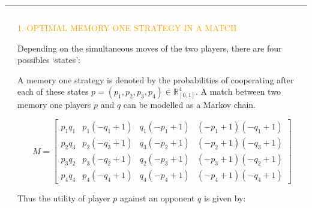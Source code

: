 \documentclass[usenames,dvipsnames,t]{beamer}
\newcommand{\R}{\mathbb{R}}
\begin{document}
\hrule height 5pt
\begin{columns}
    \begin{column}{.05\linewidth}
    \end{column}
    \begin{column}{.4\linewidth}
        \vspace{0.5cm}

        \begin{center}
        \textcolor{orange}{\large{1. OPTIMAL MEMORY ONE STRATEGY IN A MATCH}}
        \end{center}
        \vspace{0.3cm}

        \small{
        Depending on the simultaneous moves of the two players, there are four
        possibles `states':}

        \begin{center}
            
        \end{center}

        \small{
        A memory one strategy is denoted by the probabilities of cooperating after each of these states \(p = (p_1, p_2, p_3, p_4) \in \R_{[0,1]} ^ 4\).%
        A match between two memory one players \(p\) and \(q\) can be modelled as
        a Markov chain.}

        \begin{equation*}
        M = \left[\begin{matrix}p_{1} q_{1} & p_{1} \left(- q_{1} + 1\right) & q_{1} \left(- p_{1} + 1\right) & \left(- p_{1} + 1\right) \left(- q_{1} + 1\right)\\
        p_{2} q_{3} & p_{2} \left(- q_{3} + 1\right) & q_{3} \left(- p_{2} + 1\right) & \left(- p_{2} + 1\right) \left(- q_{3} + 1\right)\\
        p_{3} q_{2} & p_{3} \left(- q_{2} + 1\right) & q_{2} \left(- p_{3} + 1\right) & \left(- p_{3} + 1\right) \left(- q_{2} + 1\right)\\
        p_{4} q_{4} & p_{4} \left(- q_{4} + 1\right) & q_{4} \left(- p_{4} + 1\right) & \left(- p_{4} + 1\right) \left(- q_{4} + 1\right)\end{matrix}\right]
        \end{equation*}
        \vspace{0.3cm}

        Thus the utility of player \(p\) against an opponent \(q\) is given by:


\end{column}
\end{columns}
\end{document}
